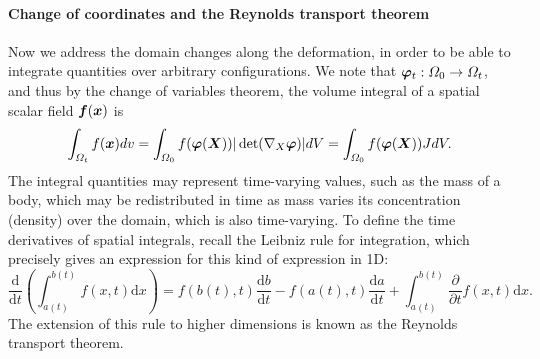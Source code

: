 \documentclass{article}
\renewcommand{\vec}{\vectorsym}
\newcommand{\vX}{\nabla_X}
\newcommand{\vvarphi}{\vec{\varphi}}
\begin{document}
\paragraph{Change of coordinates and the Reynolds transport theorem}
Now we address the domain changes along the deformation, in order to be able to integrate quantities over arbitrary configurations. We note that $\vvarphi_t:\Omega_0 \to \Omega_t$, and thus by the change of variables theorem, the volume integral of a spatial scalar field $\vec f(\vec x)$ is 
\begin{equation*}
    \int_{\Omega_t}f(\vec x)dv = \int_{\Omega_0} f(\vvarphi(\vec X)) |\det(\vX\vvarphi)| dV = \int_{\Omega_0}f(\vvarphi(\vec X)) JdV.
\end{equation*}
The integral quantities may represent time-varying values, such as the mass of a body, which may be redistributed in time as mass varies its concentration (density) over the domain, which is also time-varying. To define the time derivatives of spatial integrals, recall the Leibniz rule for integration, which precisely gives an expression for this kind of expression in 1D:
\begin{equation*}
    \frac{\mathrm{d}}{\mathrm{d}t}\left(\int_{a(t)}^{b(t)}f(x,t) \mathrm{d}x\right) = f(b(t),t) \frac{\mathrm{d}b}{\mathrm{d}t} - f(a(t),t) \frac{\mathrm{d}a}{\mathrm{d}t} + \int_{a(t)}^{b(t)}\frac{\partial}{\partial t}f(x,t)\mathrm{d}x.
\end{equation*}
The extension of this rule to higher dimensions is known as the Reynolds transport theorem. 
\end{document}
